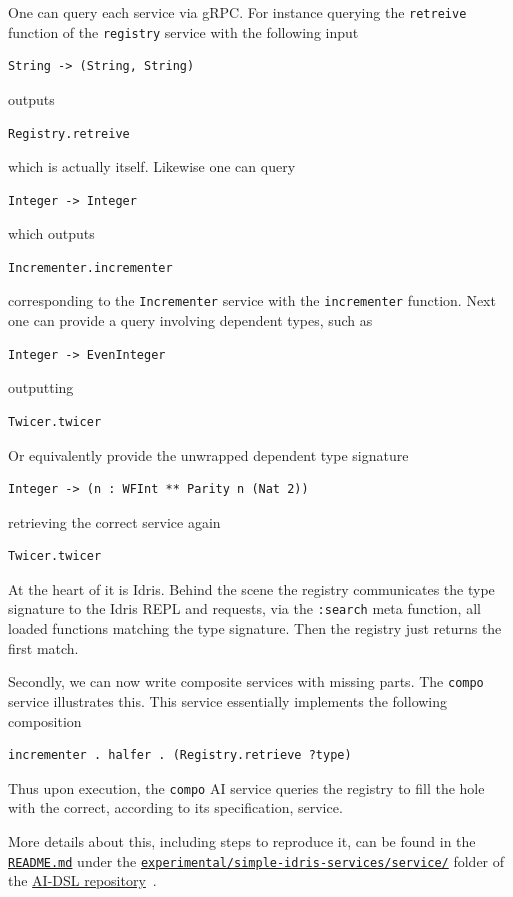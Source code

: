 \documentclass[]{report}
\begin{document}
One can query each service via gRPC.  For instance querying the
\texttt{retreive} function of the \texttt{registry} service with the
following input
\begin{verbatim}
String -> (String, String)
\end{verbatim}
outputs
\begin{verbatim}
Registry.retreive
\end{verbatim}
which is actually itself.  Likewise one can query
\begin{verbatim}
Integer -> Integer
\end{verbatim}
which outputs
\begin{verbatim}
Incrementer.incrementer
\end{verbatim}
corresponding to the \texttt{Incrementer} service with the
\texttt{incrementer} function.
Next one can provide a query involving dependent types, such as
\begin{verbatim}
Integer -> EvenInteger
\end{verbatim}
outputting
\begin{verbatim}
Twicer.twicer
\end{verbatim}
Or equivalently provide the unwrapped dependent type signature
\begin{verbatim}
Integer -> (n : WFInt ** Parity n (Nat 2))
\end{verbatim}
retrieving the correct service again
\begin{verbatim}
Twicer.twicer
\end{verbatim}

At the heart of it is Idris.  Behind the scene the registry
communicates the type signature to the Idris REPL and requests, via
the \texttt{:search} meta function, all loaded functions matching the
type signature.  Then the registry just returns the first match.

Secondly, we can now write composite services with missing parts.  The
\texttt{compo} service illustrates this.  This service essentially
implements the following composition
\begin{verbatim}
incrementer . halfer . (Registry.retrieve ?type)
\end{verbatim}
Thus upon execution, the \texttt{compo} AI service queries the
registry to fill the hole with the correct, according to its
specification, service.

More details about this, including steps to reproduce it, can be found
in the
\href{https://github.com/singnet/ai-dsl/blob/master/experimental/registry-dsl/README.md}{\texttt{README.md}}
under the
\href{https://github.com/singnet/ai-dsl/blob/master/experimental/registry-dsl/}{\texttt{experimental/simple-idris-services/service/}}
folder of the \href{https://github.com/singnet/ai-dsl/}{AI-DSL
  repository}~\cite{AIDSLRepo}.
\end{document}
